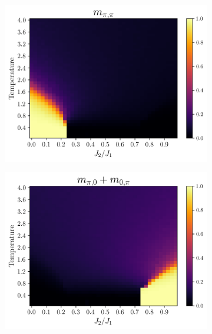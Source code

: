 \documentclass[../thesis_main.tex]{subfiles}
\begin{document}
\begin{figure}[!htb]
    \centering
    \begin{subfigure}[b]{0.43\textwidth}  %
        \centering
        \includegraphics[width=\textwidth]{images/j1-j2/phase_diagrams/p=0.50/M_pi,pi_p=0.50.png}
    \end{subfigure}
    \begin{subfigure}[b]{0.43\textwidth}
        \centering
        \includegraphics[width=\textwidth]{images/j1-j2/phase_diagrams/p=0.50/M_pi,0_p=0.50.png}
    \end{subfigure}
    \begin{subfigure}[b]{0.43\textwidth}

\end{subfigure}
\end{figure}
\end{document}
